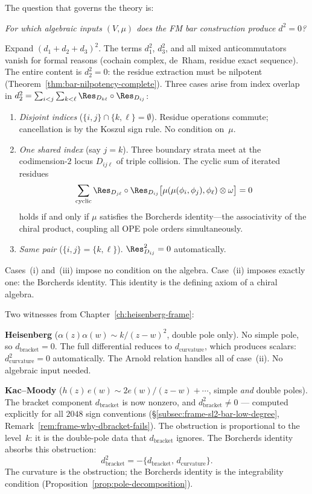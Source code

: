 The question that governs the theory is:
\begin{center}
\emph{For which algebraic inputs $(V, \mu)$ does
the FM bar construction produce $d^2 = 0$?}
\end{center}

\noindent
Expand $(d_1 + d_2 + d_3)^2$.  The terms
$d_1^2$, $d_3^2$, and all mixed anticommutators vanish
for formal reasons (cochain complex, de~Rham,
residue exact sequence).  The entire content is
$d_2^2 = 0$: the residue extraction must be nilpotent
(Theorem~\ref{thm:bar-nilpotency-complete}).
Three cases arise from index overlap in
$d_2^2 = \sum_{i<j}\sum_{k<\ell}
\Res_{D_{k\ell}} \circ \Res_{D_{ij}}$:
\begin{enumerate}[label=\textup{(\roman*)}]
\item \emph{Disjoint indices}
  ($\{i,j\} \cap \{k,\ell\} = \emptyset$).
  Residue operations commute; cancellation is by the
  Koszul sign rule.  No condition on~$\mu$.

\item \emph{One shared index} (say $j = k$).
  Three boundary strata meet at the codimension-$2$ locus
  $D_{ij\ell}$ of triple collision.  The cyclic sum of
  iterated residues
  \[
  \sum_{\textup{cyclic}}
    \Res_{D_{j\ell}} \circ \Res_{D_{ij}}
    \bigl[\mu(\mu(\phi_i, \phi_j), \phi_\ell)
    \otimes \omega\bigr]
  = 0
  \]
  holds if and only if $\mu$ satisfies the
  Borcherds identity---the associativity of the chiral
  product, coupling all OPE pole orders simultaneously.

\item \emph{Same pair}
  ($\{i,j\} = \{k,\ell\}$).
  $\Res_{D_{ij}}^2 = 0$ automatically.
\end{enumerate}
Cases~(i) and~(iii) impose no condition on the algebra.
Case~(ii) imposes exactly one: the Borcherds identity.
This identity is the defining axiom of a chiral algebra.

Two witnesses from Chapter~\ref{ch:heisenberg-frame}:

\smallskip\noindent\textbf{Heisenberg} ($\alpha(z)\alpha(w) \sim
k/(z-w)^2$, double pole only).  No simple pole, so
$d_{\mathrm{bracket}} = 0$.  The full differential reduces to
$d_{\mathrm{curvature}}$, which produces scalars:
$d_{\mathrm{curvature}}^2 = 0$ automatically.  The Arnold
relation handles all of case~(ii).  No algebraic input needed.

\smallskip\noindent\textbf{Kac--Moody} ($h(z)\,e(w) \sim
2e(w)/(z-w) + \cdots$, simple \emph{and} double poles).
The bracket component $d_{\mathrm{bracket}}$ is now nonzero, and
$d_{\mathrm{bracket}}^2 \neq 0$ --- computed explicitly for all
$2048$ sign conventions
(\S\ref{subsec:frame-sl2-bar-low-degree},
Remark~\ref{rem:frame-why-dbracket-fails}).  The obstruction is
proportional to the level~$k$: it is the double-pole data that
$d_{\mathrm{bracket}}$ ignores.  The Borcherds identity absorbs
this obstruction:
\[
d_{\mathrm{bracket}}^2
= -\{d_{\mathrm{bracket}},\, d_{\mathrm{curvature}}\}.
\]
The curvature is the obstruction; the Borcherds identity is the
integrability condition
(Proposition~\ref{prop:pole-decomposition}).

